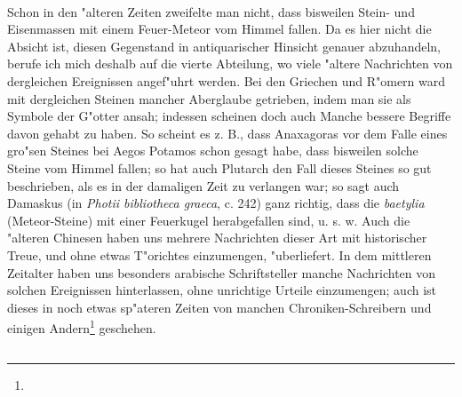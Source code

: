 \documentclass[a4paper, 11pt, oneside, polutonikogreek, german]{article}
\begin{document}
\paragraph{}
Schon in den "alteren Zeiten zweifelte man nicht, dass bisweilen Stein- und Eisenmassen mit einem Feuer-Meteor vom Himmel fallen. Da es hier nicht die Absicht ist, diesen Gegenstand in antiquarischer Hinsicht genauer abzuhandeln, berufe ich mich deshalb auf die vierte Abteilung, wo viele "altere Nachrichten von dergleichen Ereignissen angef"uhrt werden. Bei den Griechen und R"omern ward mit dergleichen Steinen mancher Aberglaube getrieben, indem man sie als Symbole der G"otter ansah; indessen scheinen doch auch Manche bessere Begriffe davon gehabt zu haben. So scheint es z. B., dass Anaxagoras vor dem Falle eines gro"sen Steines bei Aegos Potamos schon gesagt habe, dass bisweilen solche Steine vom Himmel fallen; so hat auch Plutarch den Fall dieses Steines so gut beschrieben, als es in der damaligen Zeit zu verlangen war; so sagt auch Damaskus (in \emph{Photii bibliotheca graeca}, c. 242) ganz richtig, dass die \emph{baetylia} (Meteor-Steine) mit einer Feuerkugel herabgefallen sind, u. s. w. Auch die "alteren Chinesen haben uns mehrere Nachrichten dieser Art mit historischer Treue, und ohne etwas T"orichtes einzumengen, "uberliefert. In dem mittleren Zeitalter haben uns besonders arabische Schriftsteller manche Nachrichten von solchen Ereignissen hinterlassen, ohne unrichtige Urteile einzumengen; auch ist dieses in noch etwas sp"ateren Zeiten von manchen Chroniken-Schreibern und einigen Andern\footnote{} geschehen.
\subsection{}
\end{document}
